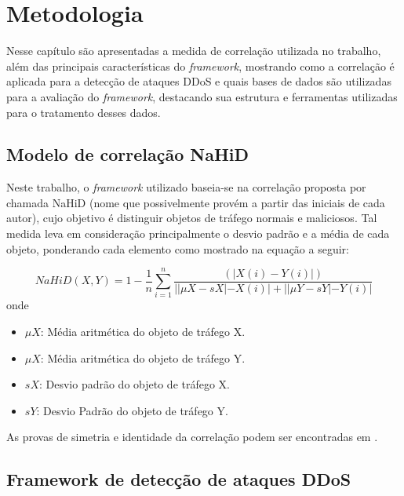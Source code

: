 \chapter[Metodologia]{Metodologia}
\label{metodologia}
Nesse capítulo são apresentadas a medida de correlação utilizada no trabalho, além das principais características do \textit{framework}, mostrando como a correlação é aplicada
para a detecção de ataques DDoS e quais bases de dados são utilizadas para a avaliação do \textit{framework}, destacando sua estrutura e ferramentas utilizadas para o tratamento desses dados.

\section{Modelo de correlação NaHiD}

Neste trabalho, o \textit{framework} utilizado baseia-se na correlação proposta por \cite{HOQUE201748} chamada NaHiD (nome que possivelmente provém a partir das iniciais de cada autor), cujo objetivo é distinguir objetos de tráfego normais e maliciosos. Tal medida leva em consideração principalmente o desvio padrão e a média de cada objeto, ponderando cada elemento como mostrado na equação a seguir:  

\begin{equation}
	NaHiD(X,Y) = 1 - \frac{1}{n} \sum_{i=1}^{n} \frac{\left(|X(i) -	 Y(i)|\right)}{||\mu{X} - sX| - X(i)| + ||\mu{Y} - sY| - Y(i)|}
\end{equation}
onde
\begin{itemize}
	\item $\mu{X}$: Média aritmética do objeto de tráfego X.
 	\item $\mu{X}$: Média aritmética do objeto de tráfego Y.
	\item $sX$: Desvio padrão do objeto de tráfego X.
	\item $sY$: Desvio Padrão do objeto de tráfego Y.
\end{itemize}
As provas de simetria e identidade da correlação podem ser encontradas em \cite{HOQUE201748}.

\section{Framework de detecção de ataques DDoS}
 

